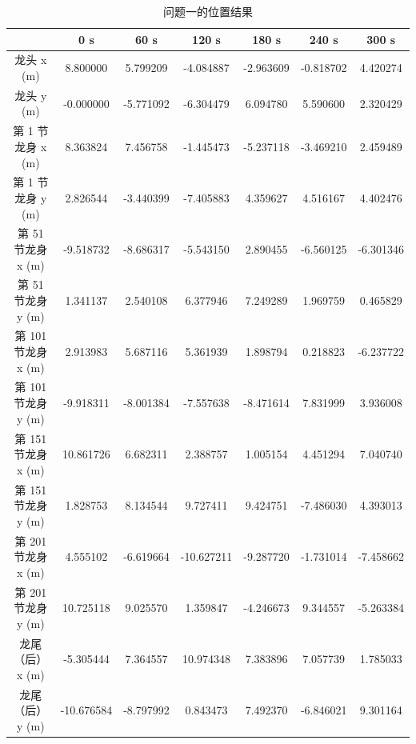 \documentclass[a4paper]{article}
\begin{document}
		\begin{table}[H] %
			\captionsetup{skip=4pt} %
			\caption{问题一的位置结果}
			\centering
			\setlength{\arrayrulewidth}{0.5pt} %
			\begin{tabular}{|c|c|c|c|c|c|c|} %
				\hline
				& 0 s & 60 s & 120 s & 180 s & 240 s & 300 s \\ \hline
				龙头 x (m)         & 8.800000 &	5.799209 &	-4.084887 &	-2.963609 &	-0.818702 &	4.420274 \\ \hline
				龙头 y (m)         & -0.000000 &	-5.771092 &	-6.304479 &	6.094780 &	5.590600 &	2.320429 \\ \hline
				第 1 节龙身 x (m)  & 8.363824 &	7.456758 &	-1.445473 &	-5.237118 &	-3.469210 &	2.459489 \\ \hline
				第 1 节龙身 y (m)  & 2.826544 &	-3.440399 &	-7.405883 &	4.359627 &	4.516167 &	4.402476 \\ \hline
				第 51 节龙身 x (m) & -9.518732 &	-8.686317 &	-5.543150 &	2.890455 &	-6.560125 &	-6.301346 \\ \hline
				第 51 节龙身 y (m) & 1.341137 &	2.540108 &	6.377946 &	7.249289 &	1.969759 &	0.465829 \\ \hline
				第 101 节龙身 x (m) &2.913983 &	5.687116 &	5.361939 &	1.898794 &	0.218823 &	-6.237722 \\ \hline
				第 101 节龙身 y (m) &-9.918311 &	-8.001384 &	-7.557638 &	-8.471614 &	7.831999 &	3.936008 \\ \hline
				第 151 节龙身 x (m) &10.861726 &	6.682311 &	2.388757 &	1.005154 &	4.451294 &	7.040740 \\ \hline
				第 151 节龙身 y (m) &1.828753 &	8.134544 &	9.727411 &	9.424751 &	-7.486030 &	4.393013 \\ \hline
				第 201 节龙身 x (m) &4.555102 &	-6.619664 &	-10.627211 &	-9.287720 &	-1.731014 &	-7.458662 \\ \hline
				第 201 节龙身 y (m) &10.725118 &	9.025570 &	1.359847 &	-4.246673 &	9.344557 &	-5.263384 \\ \hline
				龙尾（后） x (m)    &-5.305444 &	7.364557 &	10.974348 &	7.383896 &	7.057739 &	1.785033 \\ \hline
				龙尾（后） y (m)    &-10.676584 &	-8.797992 &	0.843473 &	7.492370 &	-6.846021 &	9.301164 \\ \hline
			\end{tabular}
		\end{table}
\end{document}
